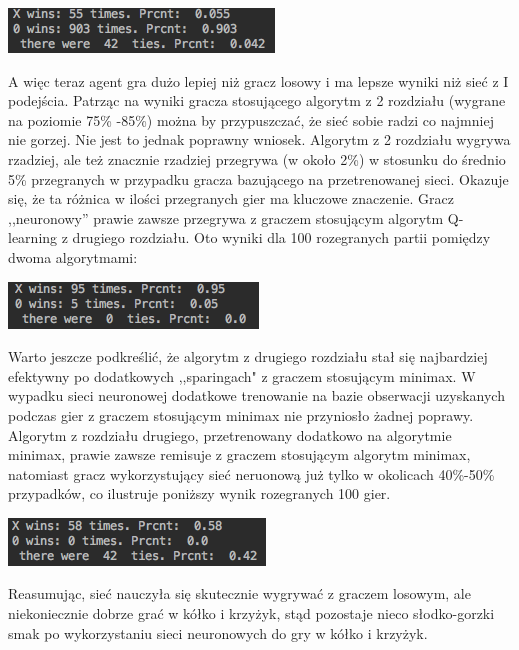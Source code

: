 \documentclass[licencjacka]{pracamgr}
\begin{document}
\begin{flushleft}
	\includegraphics [scale=0.7] {nn2_2.png}
\end{flushleft} 

A więc teraz agent gra dużo lepiej niż gracz losowy i ma lepsze wyniki niż sieć z I podejścia. Patrząc na wyniki gracza stosującego algorytm z 2 rozdziału (wygrane na poziomie 75\% -85\%)   można by przypuszczać, że sieć sobie radzi co najmniej nie gorzej. Nie jest to jednak poprawny wniosek. Algorytm z 2 rozdziału wygrywa rzadziej, ale też znacznie rzadziej przegrywa (w około 2\%) w stosunku do średnio 5\% przegranych w przypadku gracza bazującego na przetrenowanej sieci. Okazuje się, że ta różnica w ilości przegranych gier ma kluczowe znaczenie. Gracz ,,neuronowy'' prawie zawsze  przegrywa z graczem stosującym algorytm Q-learning z drugiego rozdziału. Oto wyniki dla 100 rozegranych partii pomiędzy dwoma algorytmami:

\begin{flushleft}
	\includegraphics [scale=0.7] {nn2_3.png}
\end{flushleft} 

Warto jeszcze podkreślić, że algorytm z drugiego rozdziału stał się najbardziej efektywny po dodatkowych ,,sparingach"  z graczem  stosującym minimax. W wypadku sieci neuronowej dodatkowe trenowanie na bazie obserwacji uzyskanych podczas gier z graczem stosującym minimax nie przyniosło żadnej poprawy. Algorytm z rozdziału drugiego, przetrenowany dodatkowo na algorytmie minimax, prawie zawsze remisuje z graczem stosującym algorytm minimax, natomiast gracz wykorzystujący sieć neruonową już tylko w okolicach 40\%-50\% przypadków, co ilustruje poniższy wynik rozegranych 100 gier.

\begin{flushleft}
	\includegraphics [scale=0.7] {nn2_4.png}
\end{flushleft} 

Reasumując, sieć nauczyła się skutecznie wygrywać z graczem losowym, ale niekoniecznie dobrze grać w kółko i krzyżyk, stąd pozostaje nieco słodko-gorzki smak po wykorzystaniu sieci neuronowych do gry w kółko i krzyżyk.
\end{document}
